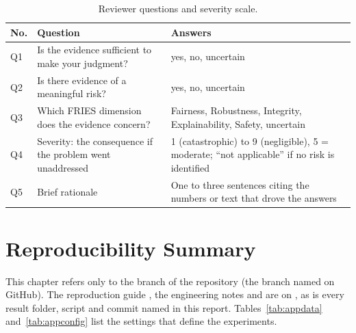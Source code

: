 \begin{table}[!htbp]
\centering\small
\caption{Reviewer questions and severity scale.}\label{tab:appquestions}
\begin{tabularx}{\textwidth}{|>{\raggedright\arraybackslash}p{0.9cm}|>{\raggedright\arraybackslash}p{5.2cm}|L|}
\hline
\textbf{No.} & \textbf{Question} & \textbf{Answers}\\
\hline
Q1 & Is the evidence sufficient to make your judgment? & yes, no, uncertain\\ \hline
Q2 & Is there evidence of a meaningful risk? & yes, no, uncertain\\ \hline
Q3 & Which FRIES dimension does the evidence concern? & Fairness, Robustness, Integrity, Explainability, Safety, uncertain\\ \hline
Q4 & Severity: the consequence if the problem went unaddressed & 1 (catastrophic) to 9 (negligible), 5 = moderate; ``not applicable'' if no risk is identified\\ \hline
Q5 & Brief rationale & One to three sentences citing the numbers or text that drove the answers\\
\hline
\end{tabularx}
\end{table}


\chapter{Reproducibility Summary}\label{app:repro}

This chapter refers only to the  branch of the repository (the branch named  on GitHub). The reproduction guide , the engineering notes  and  are on , as is every result folder, script and commit named in this report. Tables~\ref{tab:appdata} and~\ref{tab:appconfig} list the settings that define the experiments.


